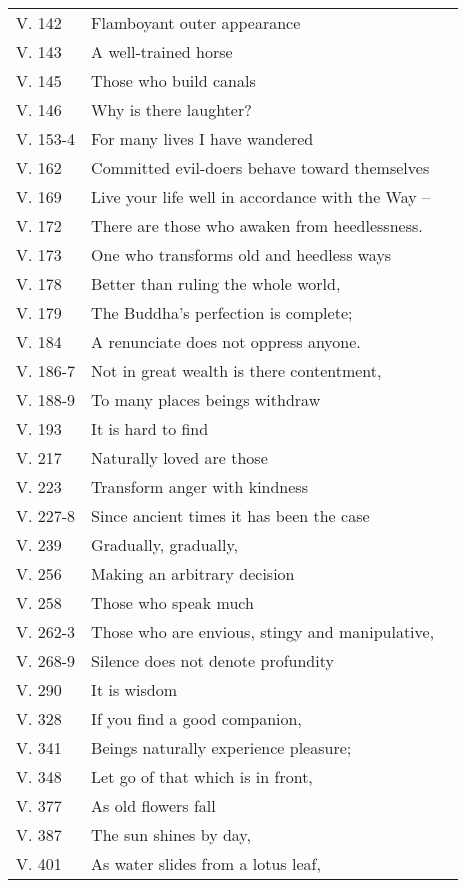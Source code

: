 {\begin{longtable}[c]{llr}
V. 142 & Flamboyant outer appearance & \pageref{dhp-142}\\
V. 143 & A well-trained horse & \pageref{dhp-143}\\
V. 145 & Those who build canals & \pageref{dhp-145}\\
V. 146 & Why is there laughter? & \pageref{dhp-146}\\
V. 153-4 & For many lives I have wandered & \pageref{dhp-153}\\
V. 162 & Committed evil-doers behave toward themselves & \pageref{dhp-162}\\
V. 169 & Live your life well in accordance with the Way -- & \pageref{dhp-169}\\
V. 172 & There are those who awaken from heedlessness. & \pageref{dhp-172}\\
V. 173 & One who transforms old and heedless ways & \pageref{dhp-173}\\
V. 178 & Better than ruling the whole world, & \pageref{dhp-178}\\
V. 179 & The Buddha's perfection is complete; & \pageref{dhp-179}\\
V. 184 & A renunciate does not oppress anyone. & \pageref{dhp-184}\\
V. 186-7 & Not in great wealth is there contentment, & \pageref{dhp-186}\\
V. 188-9 & To many places beings withdraw & \pageref{dhp-188}\\
V. 193 & It is hard to find & \pageref{dhp-193}\\
V. 217 & Naturally loved are those & \pageref{dhp-217}\\
V. 223 & Transform anger with kindness & \pageref{dhp-223}\\
V. 227-8 & Since ancient times it has been the case & \pageref{dhp-227}\\
V. 239 & Gradually, gradually, & \pageref{dhp-239}\\
V. 256 & Making an arbitrary decision & \pageref{dhp-256}\\
V. 258 & Those who speak much & \pageref{dhp-258}\\
V. 262-3 & Those who are envious, stingy and manipulative, & \pageref{dhp-262}\\
V. 268-9 & Silence does not denote profundity & \pageref{dhp-268}\\
V. 290 & It is wisdom & \pageref{dhp-290}\\
V. 328 & If you find a good companion, & \pageref{dhp-328}\\
V. 341 & Beings naturally experience pleasure; & \pageref{dhp-341}\\
V. 348 & Let go of that which is in front, & \pageref{dhp-348}\\
V. 377 & As old flowers fall & \pageref{dhp-377}\\
V. 387 & The sun shines by day, & \pageref{dhp-387}\\
V. 401 & As water slides from a lotus leaf, & \pageref{dhp-401}\\
\end{longtable}

}

